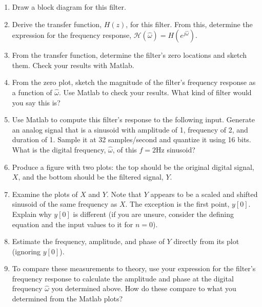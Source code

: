 \begin{enumerate}\renewcommand{\theenumi}{\alph{enumi}}

\item Draw a block diagram for this filter.


\item Derive the transfer function, $H(z)$, for this filter. From
	  this, determine the expression for the frequency response,
	  $\mathcal{H}(\hat{\omega})=H(e^{j\hat{\omega}})$.


\item From the transfer function, determine the filter's zero
	locations and sketch them. Check your results with Matlab.


\item From the zero plot, sketch the magnitude of the filter's
	  frequency response as a function of $\hat{\omega}$. Use Matlab to
	  check your results. What kind of filter would you say this is?
	  

\item Use Matlab to compute this filter's response to the following
	  input. Generate an analog signal that is a sinusoid with
          amplitude of 1, frequency of 2, and duration of 1. Sample
          it at 32 samples/second and quantize it using 16
          bits. What is the digital frequency, $\hat{\omega}$, of this
          $f=2$Hz sinusoid?

\item Produce a figure with two plots: the top should be the
          original digital signal, $X$, and the bottom should be the
          filtered signal, $Y$.

\item Examine the plots of $X$ and $Y$. Note that $Y$ appears
	  to be a scaled and shifted sinusoid of the same frequency as
	  $X$. The exception is the first point, $y[0]$. Explain why $y[0]$ is
	  different (if you are unsure, consider the defining equation
          and the input values to it for $n=0$).


\item Estimate the frequency, amplitude, and phase of $Y$ directly
	  from its plot (ignoring $y[0]$).


\item To compare these measurements to theory, use your
          expression for the filter's frequency response to calculate
          the amplitude and phase at the digital frequency
          $\hat{\omega}$ you determined above. How do these compare to
          what you determined from the Matlab plots?


\end{enumerate}

